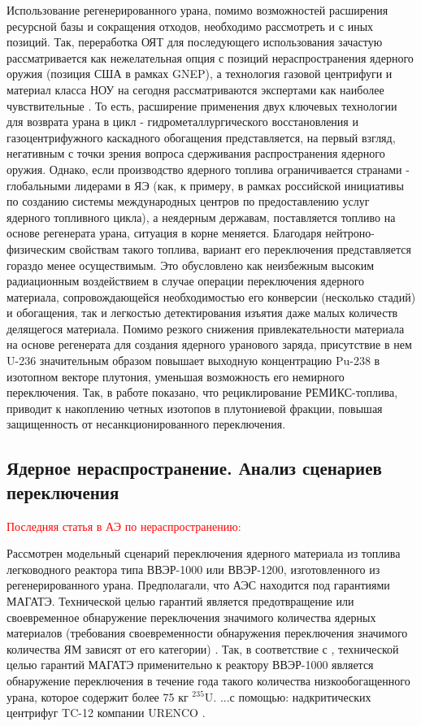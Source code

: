 Использование регенерированного урана, помимо возможностей расширения ресурсной базы и сокращения отходов, необходимо рассмотреть и с иных позиций. Так, переработка ОЯТ для последующего использования зачастую рассматривается как нежелательная опция с позиций нераспространения ядерного оружия (позиция США в рамках GNEP), а технология газовой центрифуги и материал класса НОУ на сегодня рассматриваются экспертами как наиболее чувствительные \cite{nevinicaPovyshenieZashchishchennostiEksportnyh}. То есть, расширение применения двух ключевых технологии для возврата урана в цикл - гидрометаллургического восстановления и газоцентрифужного каскадного обогащения представляется, на первый взгляд, негативным с точки зрения вопроса сдерживания распространения ядерного оружия. Однако, если производство ядерного топлива ограничивается странами - глобальными лидерами в ЯЭ (как, к примеру, в рамках российской инициативы по созданию системы международных центров по предоставлению услуг ядерного топливного цикла), а неядерным державам, поставляется топливо на основе регенерата урана, ситуация в корне меняется. Благодаря нейтроно-физическим свойствам такого топлива, вариант его переключения представляется гораздо менее осуществимым. Это обусловлено как неизбежным высоким радиационным воздействием в случае операции переключения ядерного материала, сопровождающейся необходимостью его конверсии (несколько стадий) и обогащения, так и легкостью детектирования изъятия даже малых количеств делящегося материала. Помимо резкого снижения привлекательности материала на основе регенерата для создания ядерного уранового заряда, присутствие в нем U-236 значительным образом повышает выходную концентрацию Pu-238 в изотопном векторе плутония, уменьшая возможность его немирного переключения. Так, в работе \cite{solovevAnalizYadernogoToplivnogo2019} показано, что рециклирование РЕМИКС-топлива, приводит к накоплению четных изотопов в плутониевой фракции, повышая защищенность от несанкционированного переключения.


\subsection{Ядерное нераспространение. Анализ сценариев переключения}\label{sec:ch2/sec4.1}

\textcolor{red}{Последняя статья в АЭ по нераспространению:}

Рассмотрен модельный сценарий переключения ядерного материала из топлива легководного реактора типа ВВЭР-1000 или ВВЭР-1200,  изготовленного из регенерированного урана. Предполагали, что АЭС находится под гарантиями МАГАТЭ. Технической целью гарантий является предотвращение или своевременное обнаружение переключения значимого количества ядерных материалов (требования своевременности обнаружения переключения значимого количества ЯМ зависят от  его категории) \cite{ermakovVozmozhnyeProceduryGarantiy1987}. Так, в соответствие с \cite{ermakovVozmozhnyeProceduryGarantiy1987}, технической целью гарантий МАГАТЭ применительно к реактору ВВЭР-1000 является обнаружение переключения в течение года такого количества низкообогащенного урана, которое содержит более 75 кг $^{235}$U.
...с помощью:  надкритических центрифуг TC-12 компании URENCO \cite{borisevichIdealOptimumCascades2014}. 


